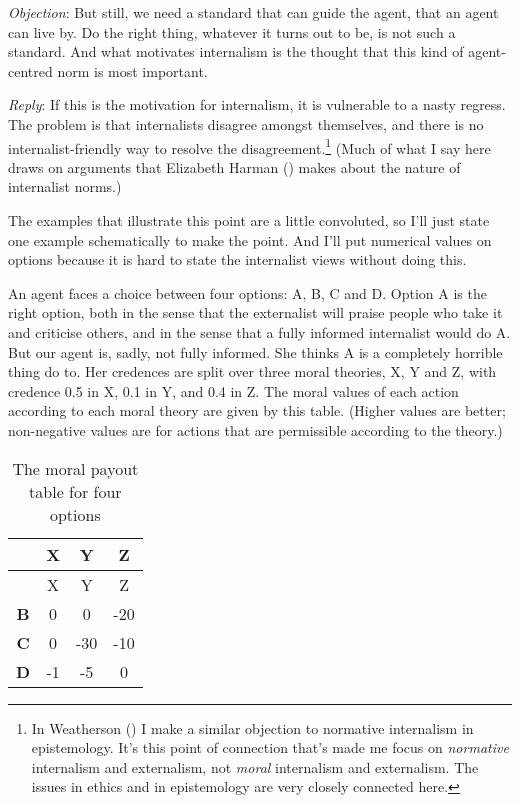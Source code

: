 \documentclass[
  11pt,
  letterpaper,
  DIV=11,
  numbers=noendperiod,
  twoside]{scrartcl}
\begin{document}
\emph{Objection}: But still, we need a standard that can guide the
agent, that an agent can live by. Do the right thing, whatever it turns
out to be, is not such a standard. And what motivates internalism is the
thought that this kind of agent-centred norm is most important.

\emph{Reply}: If this is the motivation for internalism, it is
vulnerable to a nasty regress. The problem is that internalists disagree
amongst themselves, and there is no internalist-friendly way to resolve
the disagreement.\footnote{In Weatherson
  () I make a similar objection
  to normative internalism in epistemology. It's this point of
  connection that's made me focus on \emph{normative} internalism and
  externalism, not \emph{moral} internalism and externalism. The issues
  in ethics and in epistemology are very closely connected here.} (Much
of what I say here draws on arguments that Elizabeth Harman
() makes about the nature of internalist
norms.)

The examples that illustrate this point are a little convoluted, so I'll
just state one example schematically to make the point. And I'll put
numerical values on options because it is hard to state the internalist
views without doing this.

An agent faces a choice between four options: A, B, C and D. Option A is
the right option, both in the sense that the externalist will praise
people who take it and criticise others, and in the sense that a fully
informed internalist would do A. But our agent is, sadly, not fully
informed. She thinks A is a completely horrible thing do to. Her
credences are split over three moral theories, X, Y and Z, with credence
0.5 in X, 0.1 in Y, and 0.4 in Z. The moral values of each action
according to each moral theory are given by this table. (Higher values
are better; non-negative values are for actions that are permissible
according to the theory.)

\begin{longtable}[]{@{}cccc@{}}
\caption{The moral payout table for four
options}\label{tbl-payout}\tabularnewline
\toprule\noalign{}
& X & Y & Z \\
\midrule\noalign{}
\endfirsthead
\toprule\noalign{}
& X & Y & Z \\
\midrule\noalign{}
\endhead
\bottomrule\noalign{}
\endlastfoot
\textbf{B} & 0 & 0 & -20 \\
\textbf{C} & 0 & -30 & -10 \\
\textbf{D} & -1 & -5 & 0 \\
\end{longtable}
\end{document}
